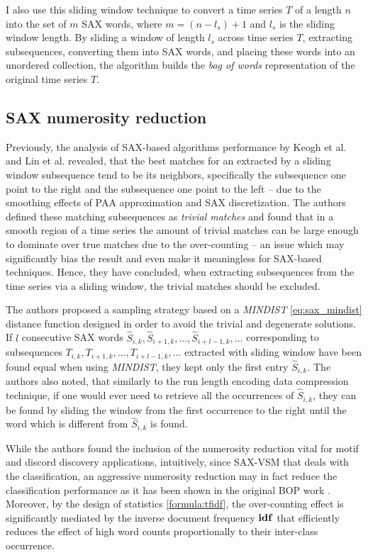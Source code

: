 I also use this sliding window technique to convert a time series $T$ of a length $n$ into 
the set of $m$ SAX words, where $m=(n-l_{s})+1$ and $l_{s}$ is the sliding window length. 
By sliding a window of length $l_{s}$ across time series $T$, extracting subsequences, 
converting them into SAX words, and placing these words into an unordered collection, 
the algorithm builds the \textit{bag of words} representation of the original time series $T$.

\subsection{SAX numerosity reduction}\label{section_numerosity_reduction}
Previously, the analysis of SAX-based algorithms performance by Keogh et al. \cite{citeulike:3977965} and 
Lin et al. \cite{citeulike:3175749} revealed, that the best matches for an extracted by a sliding window 
subsequence tend to be its neighbors, specifically the subsequence one point to the right and the subsequence 
one point to the left -- due to the smoothing effects of PAA approximation and SAX discretization. 
The authors defined these matching subsequences as \textit{trivial matches} and found that in a smooth region 
of a time series the amount of trivial matches can be large enough to dominate over true matches due to 
the over-counting -- an issue which may significantly bias the result and even make it meaningless 
\cite{citeulike:227029} for SAX-based techniques. 
Hence, they have concluded, when extracting subsequences from the time series via a sliding window, 
the trivial matches should be excluded. 

The authors proposed a sampling strategy based on a \textit{MINDIST} \eqref{eq:sax_mindist} distance 
function designed in order to avoid the trivial and degenerate solutions.
If $l$ consecutive SAX words \newline $\widehat{S}_{i,k}, \widehat{S}_{i+1,k},...,\widehat{S}_{i+l-1,k},...$
corresponding to subsequences $T_{i,k}, T_{i+1,k},...,T_{i+l-1,k},...$ extracted with sliding window have been
found equal when using \textit{MINDIST}, they kept only the first entry $\widehat{S}_{i,k}$. 
The authors also noted, that similarly to the run length encoding data compression technique, if one would ever need to 
retrieve all the occurrences of $\widehat{S}_{i,k}$, they can be found by sliding the window from 
the first occurrence to the right until the word which is different from $\widehat{S}_{i,k}$ is found. 

While the authors found the inclusion of the numerosity reduction vital for motif and discord discovery applications, 
intuitively, since SAX-VSM that deals with the classification, an aggressive numerosity reduction may 
in fact reduce the classification performance as it has been shown in the original BOP work \cite{citeulike:10525778}. 
Moreover, by the design of \tfidf statistics \eqref{formula:tfidf}, the over-counting effect is significantly mediated 
by the inverse document frequency $\text{\textbf{idf}}$ that efficiently reduces the effect of high word counts 
proportionally to their inter-class occurrence.

